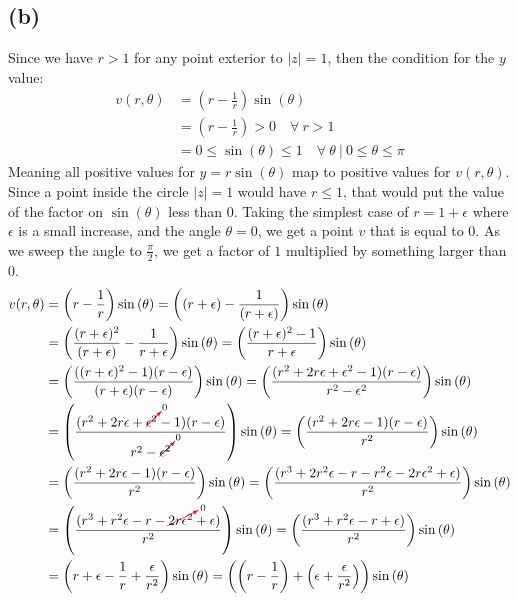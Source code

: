 \documentclass{article}
\newcommand{\canceling}[2]{\textcolor{red}{\cancelto{\textcolor{black}{#1}}{\textcolor{black}{#2}}}}
\begin{document}
\subsection*{(b)}
Since we have $r > 1$ for any point exterior to $|z| = 1$, then the condition for the $y$ value:
\begin{align*}
	v(r,\theta) & = \left(r - \frac{1}{r}\right)\sin{(\theta)}                                    \\
	            & = \left(r - \frac{1}{r}\right) > 0 \quad \forall\ r > 1                         \\
	            & = 0 \leq \sin{(\theta)} \leq 1 \quad \forall\ \theta\ |\ 0 \leq \theta \leq \pi
\end{align*}
Meaning all positive values for $y=r\sin{(\theta)}$ map to positive values for $v(r,\theta)$. Since a point inside the circle $|z|= 1$ would have $r \leq 1$, that would put the value of the factor on $\sin{(\theta)}$ less than $0$. Taking the simplest case of $r = 1+\epsilon$ where $\epsilon$ is a small increase, and the angle $\theta = 0$, we get a point $v$ that is equal to $0$. As we sweep the angle to $\frac{\pi}{2}$, we get a factor of $1$ multiplied by something larger than 0.
\begin{align*}
	v(r,\theta) & = \left(r - \frac{1}{r}\right)\sin{(\theta)} = \left((r+\epsilon) - \frac{1}{(r+\epsilon)}\right)\sin{(\theta)}                                                                                       \\
	            & =\left(\frac{(r+\epsilon)^2}{(r+\epsilon)} - \frac{1}{r+\epsilon}\right)\sin{(\theta)}=\left(\frac{(r+\epsilon)^2-1}{r+\epsilon}\right)\sin{(\theta)}                                                 \\
	            & =\left(\frac{((r+\epsilon)^2-1)(r-\epsilon)}{(r+\epsilon)(r-\epsilon)}\right)\sin{(\theta)}=\left(\frac{(r^2+2r\epsilon + \epsilon^2 -1)(r-\epsilon)}{r^2-\epsilon^2}\right)\sin{(\theta)}            \\
	            & =\left(\frac{(r^2+2r\epsilon + \canceling{0}{\epsilon^2} -1)(r-\epsilon)}{r^2-\canceling{0}{\epsilon^2}}\right)\sin{(\theta)}=\left(\frac{(r^2+2r\epsilon  -1)(r-\epsilon)}{r^2}\right)\sin{(\theta)} \\
	            & =\left(\frac{(r^2+2r\epsilon  -1)(r-\epsilon)}{r^2}\right)\sin{(\theta)} =\left(\frac{(r^3+2r^2\epsilon -r -r^2\epsilon-2r\epsilon^2+\epsilon)}{r^2}\right)\sin{(\theta)}                             \\
	            & =\left(\frac{(r^3+r^2\epsilon -r -\canceling{0}{2r\epsilon^2}+\epsilon)}{r^2}\right)\sin{(\theta)}
	=\left(\frac{(r^3+r^2\epsilon -r +\epsilon)}{r^2}\right)\sin{(\theta)}                                                                                                                                              \\
	            & =\left(r + \epsilon - \frac{1}{r} + \frac{\epsilon}{r^2}\right)\sin{(\theta)} = \left(\left(r - \frac{1}{r}\right)+ \left(\epsilon  + \frac{\epsilon}{r^2}\right)\right)\sin{(\theta)}
\end{align*}
\end{document}
